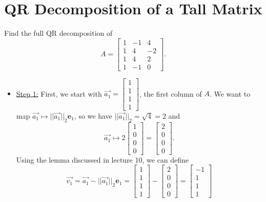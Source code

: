 \documentclass[letterpaper]{article}
\newcommand{\0}{\mathbf{0}}
\newcommand{\e}{\mathbf{e}}
\begin{document}
\section{QR Decomposition of a Tall Matrix}
\begin{mdframed}
    Find the full QR decomposition of \[A = \begin{bmatrix}
        1 & -1 & 4 \\
        1 & 4 & -2 \\ 
        1 & 4 & 2 \\ 
        1 & -1 & 0
    \end{bmatrix}.\]
\end{mdframed}

\begin{itemize}
    \item \underline{Step 1:} First, we start with $\vec{a_1} = \begin{bmatrix}
        1 \\ 1 \\ 1 \\ 1
    \end{bmatrix}$, the first column of $A$. We want to map $\vec{a_1} \mapsto ||\vec{a_1}||_2 \e_1$, so we have $||\vec{a_1}||_2 = \sqrt{4} = 2$ and \[\vec{a_1} \mapsto 2\begin{bmatrix}
        1 \\ 0 \\ 0 \\ 0
    \end{bmatrix} = \begin{bmatrix}
        2 \\ 0 \\ 0 \\ 0
    \end{bmatrix}.\] Using the lemma discussed in lecture 10, we can define \[\vec{v_1} = \vec{a_1} - ||\vec{a_1}||_2 \e_1 = \begin{bmatrix}
        1\\1\\1\\1
    \end{bmatrix} - \begin{bmatrix}
        2\\0\\0\\0
    \end{bmatrix} = \begin{bmatrix}
        -1 \\ 1 \\ 1 \\ 1

\end{bmatrix}\]
\end{itemize}
\end{document}
